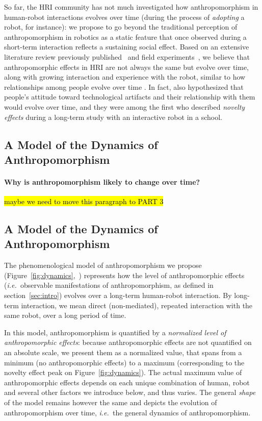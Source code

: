 \documentclass{frontiersSCNS} %
\newcommand{\ie}{{\textit{i.e.~}}}
\begin{document}
So far, the HRI community has not much investigated how anthropomorphism in
human-robot interactions evolves over time (during the process of
\emph{adopting} a robot, for instance): we propose to go beyond the traditional
perception of anthropomorphism in robotics as a static feature that once
observed during a short-term interaction reflects a sustaining social effect.
Based on an extensive literature review previously
published~\cite{fink_anthropomorphism_2012} and field
experiments~, we believe that anthropomorphic effects in HRI are
not always the same but evolve over time, along with growing interaction and
experience with the robot, similar to how relationships among people evolve
over time . In fact, \cite{kanda_interactive_2004}
also hypothesized that people's attitude toward technological artifacts and
their relationship with them would evolve over time, and they were among the
first who described \emph{novelty effects} during a long-term study with an
interactive robot in a school.


\subsection{A Model of the Dynamics of Anthropomorphism}
\label{sec:dynamics-model}

\paragraph{Why is anthropomorphism likely to change over time?}
\hl{maybe we need to move this paragraph to PART 3}


\subsection{A Model of the Dynamics of Anthropomorphism}

The phenomenological model of anthropomorphism we propose
(Figure~\ref{fig:dynamics},~\cite{lemaignan2014dynamics}) represents how the
level of anthropomorphic effects (\ie observable manifestations of
anthropomorphism, as defined in section~\ref{sec:intro}) evolves over a
long-term human-robot interaction. By long-term interaction, we mean direct
(non-mediated), repeated interaction with the same robot, over a long period of
time. 

In this model, anthropomorphism is quantified by a \emph{normalized level of
anthropomorphic effects}: because anthropomorphic effects are not quantified on
an absolute scale, we present them as a normalized value, that spans from a
minimum (no anthropomorphic effects) to a maximum (corresponding to the novelty
effect peak on Figure~\ref{fig:dynamics}). The actual maximum value of
anthropomorphic effects depends on each unique combination of human, robot and
several other factors we introduce below, and thus varies. The general
\emph{shape} of the model remains however the same and depicts the evolution of
anthropomorphism over time, \ie the general dynamics of anthropomorphism.
\end{document}
